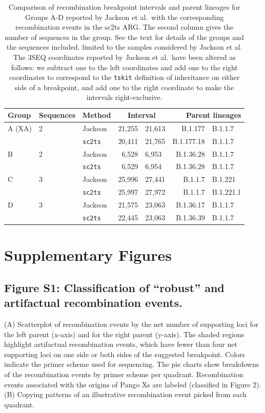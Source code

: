 \documentclass[12pt,letterpaper]{article}
\begin{document}
\begin{table} \centering
\caption{\label{tab:jackson}Comparison of recombination breakpoint
intervals and parent lineages for Groups A-D
reported by Jackson et al.\ with the corresponding
recombination events in the sc2ts ARG.
The second column gives the number of sequences in the group.
See the text for details of the groups and the sequences included.
limited to the samples considered by Jackson et al.
The 3SEQ coordinates reported by Jackson et al.\ have been altered as follows: 
we subtract one to the left coordinates and add one to the right coordinates 
to correspond to the \texttt{tskit} definition of inheritance on either side of a breakpoint,
and add one to the right coordinate to make the intervals right-exclusive. }
\begin{tabular}{lllr@{--}lr@{+}l}
\toprule
Group        & Sequences & Method & \multicolumn{2}{c}{Interval}
    & \multicolumn{2}{r}{Parent lineages} \\
\midrule
A (XA)       & 2   & Jackson        &  21,255&21,613 & B.1.177&B.1.1.7 \\
             &     &\texttt{sc2ts} &  20,411&21,765 & B.1.177.18&B.1.1.7 \\
\cmidrule{3-7}
B            & 2   & Jackson        &  6,528&6,953 & B.1.36.28&B.1.1.7  \\
             &     &\texttt{sc2ts} &   6,529&6,954 & B.1.36.28&B.1.1.7  \\
\cmidrule{3-7}
C            & 3   &Jackson         &  25,996&27,441 &  B.1.1.7&B.1.221 \\
             &     & \texttt{sc2ts} &  25,997&27,972 &  B.1.1.7&B.1.221.1 \\
\cmidrule{3-7}
D            & 3   & Jackson        &  21,575&23,063 &  B.1.36.17&B.1.1.7 \\
             &     & \texttt{sc2ts} &  22,445&23,063 &  B.1.36.39&B.1.1.7 \\
\bottomrule
\end{tabular}
\end{table}


\section*{Supplementary Figures}

\subsection*{Figure S1: Classification of “robust” and artifactual recombination events.}
(A) Scatterplot of recombination events by the net number of supporting loci for the left parent (x-axis) and for the right parent (y-axis).
The shaded regions highlight artifactual recombination events,
which have fewer than four net supporting loci on one side or both sides of the suggested breakpoint.
Colors indicate the primer scheme used for sequencing.
The pie charts show breakdowns of the recombination events by primer scheme per quadrant.
Recombination events associated with the origins of Pango Xs are labeled (classified in Figure 2).
(B) Copying patterns of an illustrative recombination event picked from each quadrant.
\end{document}
